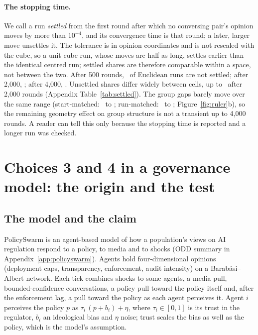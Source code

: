 \documentclass[11pt]{article}
\begin{document}
\paragraph{The stopping time.}
We call a run \emph{settled} from the first round after which no conversing pair's opinion moves by more than $10^{-4}$, and its convergence time is that round; a later, larger move unsettles it.
The tolerance is in opinion coordinates and is not rescaled with the cube, so a unit-cube run, whose moves are half as long, settles earlier than the identical centred run; settled shares are therefore comparable within a space, not between the two.
After 500 rounds, \VUnsettledFive\ of Euclidean runs are not settled; after 2{,}000, \VUnsettledTwo; after 4{,}000, \VUnsettledFour.
Unsettled shares differ widely between cells, up to \VUnsettledMaxCell\ after 2{,}000 rounds (Appendix Table~\ref{tab:settled}).
The group gaps barely move over the same range (start-matched: \VHorTzeroFive\ to \VHorTzeroFour; run-matched: \VHorRunFive\ to \VHorRunFour; Figure~\ref{fig:ruler}b), so the remaining geometry effect on group structure is not a transient up to 4{,}000 rounds.
A reader can tell this only because the stopping time is reported and a longer run was checked.

\section{Choices 3 and 4 in a governance model: the origin and the test}
\label{sec:case}

\subsection{The model and the claim}
PolicySwarm \citep{policyswarm} is an agent-based model of how a population's views on AI regulation respond to a policy, to media and to shocks (ODD summary in Appendix~\ref{app:policyswarm}).
Agents hold four-dimensional opinions (deployment caps, transparency, enforcement, audit intensity) on a Barab\'asi--Albert network.
Each tick combines shocks to some agents, a media pull, bounded-confidence conversations, a policy pull toward the policy itself and, after the enforcement lag, a pull toward the policy as each agent perceives it.
Agent $i$ perceives the policy $p$ as $\tau_i\,(p + b_i) + \eta$, where $\tau_i \in [0,1]$ is its trust in the regulator, $b_i$ an ideological bias and $\eta$ noise; trust scales the bias as well as the policy, which is the model's assumption.
\end{document}
